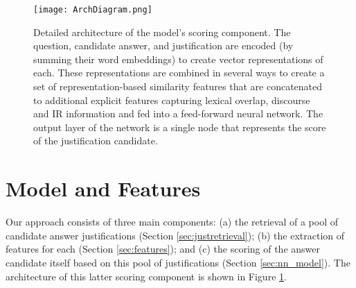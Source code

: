 
\begin{figure}[t]
\begin{center}
\texttt{[image: ArchDiagram.png]}
\caption{ Detailed architecture of the model's scoring component.  
The question, candidate answer, and justification %
 are encoded (by summing their word embeddings) to create vector representations of each. These representations are combined in several ways to create a set of representation-based similarity features that are concatenated to additional explicit features capturing lexical overlap, discourse and IR information and fed into a feed-forward neural network.  The output layer of the network is a single node that represents the score of the justification candidate.}  %
\label{fig:arch}
\vspace{-5mm}
\end{center}
\end{figure}


\section{Model and Features}
\label{sec:pipeline}
Our approach consists of three main components: (a) the retrieval of a pool of candidate answer justifications (Section \ref{sec:justretrieval}); (b) the extraction of features for each (Section \ref{sec:features}); and (c) the scoring of the answer candidate itself based on this pool of justifications (Section \ref{sec:nn_model}).  The architecture of this latter scoring component is shown in Figure \ref{fig:arch}. 



